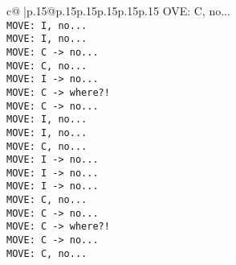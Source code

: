 \documentclass{article}
\begin{document}
{\begin{supertabular}{c@{$\;$}|p{.15\linewidth}@{}p{.15\linewidth}p{.15\linewidth}p{.15\linewidth}p{.15\linewidth}p{.15\linewidth}}
{{{OVE: C, no...\\ \tt  MOVE: I, no...\\ \tt  MOVE: I, no...\\ \tt  MOVE: C -> no...\\ \tt  MOVE: C, no...\\ \tt  MOVE: I -> no...\\ \tt  MOVE: C -> where?!\\ \tt  MOVE: C -> no...\\ \tt  MOVE: I, no...\\ \tt  MOVE: I, no...\\ \tt  MOVE: C, no...\\ \tt  MOVE: I -> no...\\ \tt  MOVE: I -> no...\\ \tt  MOVE: I -> no...\\ \tt  MOVE: C, no...\\ \tt  MOVE: C -> no...\\ \tt  MOVE: C -> where?!\\ \tt  MOVE: C -> no...\\ \tt  MOVE: C, no...\\ \tt  }}}
\end{supertabular}}
\end{document}
